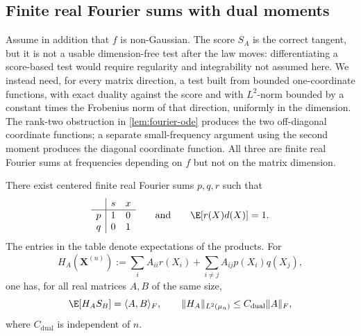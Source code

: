 \subsection{Finite real Fourier sums with dual moments}
\label{sec:fourier-dual-moments}

Assume in addition that \(f\) is non-Gaussian.  The score \(S_A\) is the correct
tangent, but it is not a usable dimension-free test after the law moves:
differentiating a score-based test would require regularity and integrability
not assumed here.  We instead need, for every matrix direction, a test built
from bounded one-coordinate functions, with exact duality against the score and
with \(L^2\)-norm bounded by a constant times the Frobenius norm of that
direction, uniformly in the dimension.  The rank-two
obstruction in \cref{lem:fourier-ode} produces the two off-diagonal coordinate
functions; a separate small-frequency argument using the second moment
produces the diagonal coordinate function.  All three are finite real Fourier
sums at frequencies depending on \(f\) but not on the matrix dimension.

\begin{lemma}
\label{lem:fourier-dual-moments}
There exist centered finite real Fourier sums $p,q,r$ such that
\begin{equation}
 \begin{array}{c|cc}
       &s&x\\ \hline
 p     &1&0\\
 q     &0&1
 \end{array}
 \qquad\text{and}\qquad \E[r(X)d(X)]=1.
 \label{eq:fourier-dual-moments}
\end{equation}
The entries in the table denote expectations of the products.
For
\begin{equation}
 H_A(\mathbf X^{(n)}):=\sum_i A_{ii}r(X_i)
              +\sum_{i\ne j}A_{ij}p(X_i)q(X_j),
 \label{eq:fourier-functions}
\end{equation}
one has, for all real matrices $A,B$ of the same size,
\begin{equation}
 \E[H_AS_B]=\langle A,B\rangle_F,
 \qquad \|H_A\|_{L^2(\mu_n)}\le C_{\mathrm{dual}}\|A\|_F,
 \label{eq:matched-fourier-pairing}
\end{equation}
where $C_{\mathrm{dual}}$ is independent of $n$.
\end{lemma}

